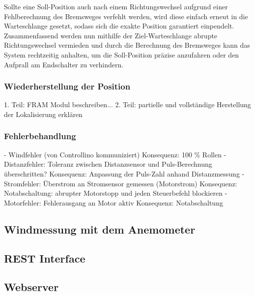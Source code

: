 \noindent
Sollte eine Soll-Position auch nach einem Richtungswechsel aufgrund einer Fehlberechnung des Bremsweges verfehlt werden, wird diese einfach erneut in die Warteschlange gesetzt, sodass sich die exakte Position garantiert einpendelt. Zusammenfassend werden nun mithilfe der Ziel-Warteschlange abrupte Richtungswechsel vermieden und durch die Berechnung des Bremsweges kann das System rechtzeitig anhalten, um die Soll-Position präzise anzufahren oder den Aufprall am Endschalter zu verhindern.
\subsubsection{Wiederherstellung der Position}
1. Teil: FRAM Modul beschreiben...
2. Teil: partielle und vollständige Herstellung der Lokalisierung erklären
\subsubsection{Fehlerbehandlung}
- Windfehler (von Controllino kommuniziert)
	Konsequenz: 100 \% Rollen
- Distanzfehler: Toleranz zwischen Distanzsensor und Puls-Berechnung überschritten?
	Konsequenz: Anpassung der Puls-Zahl anhand Distanzmessung
- Stromfehler: Überstrom an Stromsensor gemessen (Motorstrom)
	Konsequenz: Notabschaltung: abrupter Motorstopp und jeden Steuerbefehl blockieren
- Motorfehler: Fehlerausgang an Motor aktiv
	Konsequenz: Notabschaltung
\subsection{Windmessung mit dem Anemometer}
\subsection{REST Interface}
\subsection{Webserver}





